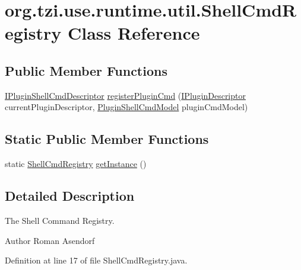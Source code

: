 \hypertarget{classorg_1_1tzi_1_1use_1_1runtime_1_1util_1_1_shell_cmd_registry}{\section{org.\-tzi.\-use.\-runtime.\-util.\-Shell\-Cmd\-Registry Class Reference}
\label{classorg_1_1tzi_1_1use_1_1runtime_1_1util_1_1_shell_cmd_registry}
}
\subsection*{Public Member Functions}
\begin{DoxyCompactItemize}
\item 
\hyperlink{interfaceorg_1_1tzi_1_1use_1_1runtime_1_1shell_1_1_i_plugin_shell_cmd_descriptor}{I\-Plugin\-Shell\-Cmd\-Descriptor} \hyperlink{classorg_1_1tzi_1_1use_1_1runtime_1_1util_1_1_shell_cmd_registry_aabd5e5db258f657b2e4c5fb4095f3a69}{register\-Plugin\-Cmd} (\hyperlink{interfaceorg_1_1tzi_1_1use_1_1runtime_1_1_i_plugin_descriptor}{I\-Plugin\-Descriptor} current\-Plugin\-Descriptor, \hyperlink{classorg_1_1tzi_1_1use_1_1runtime_1_1model_1_1_plugin_shell_cmd_model}{Plugin\-Shell\-Cmd\-Model} plugin\-Cmd\-Model)
\end{DoxyCompactItemize}
\subsection*{Static Public Member Functions}
\begin{DoxyCompactItemize}
\item 
static \hyperlink{classorg_1_1tzi_1_1use_1_1runtime_1_1util_1_1_shell_cmd_registry}{Shell\-Cmd\-Registry} \hyperlink{classorg_1_1tzi_1_1use_1_1runtime_1_1util_1_1_shell_cmd_registry_aae7c45ceaad8f1e6984eb43ca208c842}{get\-Instance} ()
\end{DoxyCompactItemize}


\subsection{Detailed Description}
The Shell Command Registry.

\begin{DoxyAuthor}{Author}
Roman Asendorf 
\end{DoxyAuthor}


Definition at line 17 of file Shell\-Cmd\-Registry.\-java.



